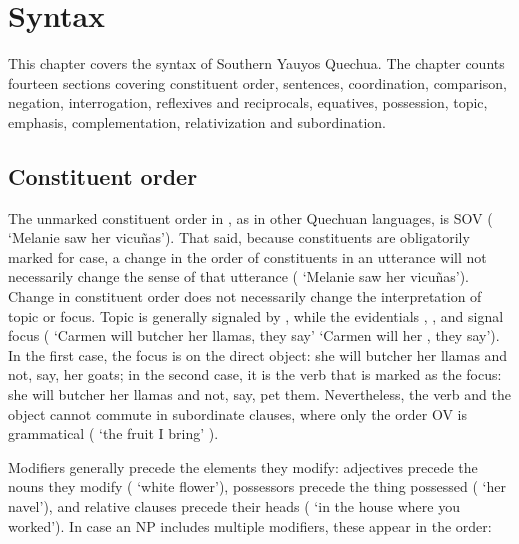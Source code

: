 \chapter{Syntax}\label{ch:syntax}
This chapter covers the syntax of Southern Yauyos Quechua. The chapter counts fourteen sections covering constituent order, sentences, coordination, comparison, negation, interrogation, reflexives and reciprocals, equatives, possession, topic, emphasis, complementation, relativization and subordination. 

\section{Constituent order}\label{sec:conord}
The unmarked constituent order in \SYQ, as in other Quechuan languages, is SOV (   ‘Melanie saw her vicuñas’). That said, because constituents are obligatorily marked for case, a change in the order of constituents in an utterance will not necessarily change the sense of that utterance (   ‘Melanie saw her vicuñas’). Change in constituent order does not necessarily change the interpretation of topic or focus. Topic is generally signaled by , while the evidentials , , and  signal focus (   ‘Carmen will butcher her llamas, they say’    ‘Carmen will  her , they say’). In the first case, the focus is on the direct object: she will butcher her llamas and not, say, her goats; in the second case, it is the verb that is marked as the focus: she will butcher her llamas and not, say, pet them. Nevertheless, the verb and the object cannot commute in subordinate clauses, where only the order OV is grammatical (  ‘the fruit I bring’  ).

Modifiers generally precede the elements they modify: adjectives precede the nouns they modify (  ‘white flower’), possessors precede the thing possessed (  ‘her navel’), and relative clauses precede their heads (  ‘in the house where you worked’). In case an NP includes multiple modifiers, these appear in the order:


